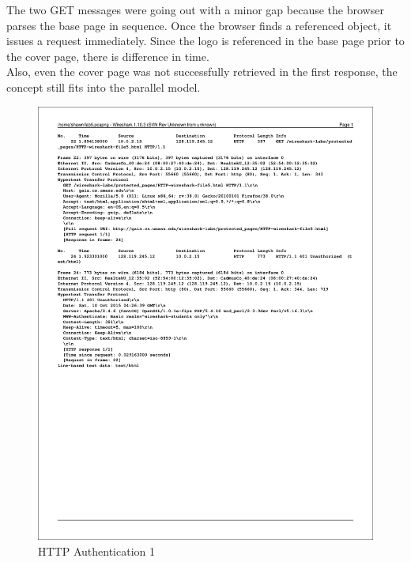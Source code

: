 \documentclass[titlepage, paper=a4, fontsize=11pt]{scrartcl} %
\numberwithin{equation}{section} %
\numberwithin{figure}{section} %
\numberwithin{table}{section} %
\begin{document}
The two GET messages were going out with a minor gap because the browser parses the base page in sequence.
Once the browser finds a referenced object, it issues a request immediately. Since the logo is referenced in the base page prior to the cover page, there is difference in time. \\

Also, even the cover page was not successfully retrieved in the first response, the concept still fits into the parallel model. \\


\newpage


\begin{figure}[!ht]
    \includegraphics[width=\textwidth]{images/authn1.pdf}
    \caption{HTTP Authentication 1}
    \label{fig:authn1}
\end{figure}
\end{document}
